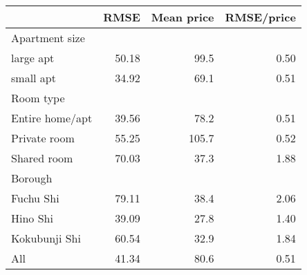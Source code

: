
\begin{tabular}{lrrr}
\toprule
 & RMSE & Mean price & RMSE/price\\
\midrule
Apartment size &  &  & \\
large apt & 50.18 & 99.5 & 0.50\\
small apt & 34.92 & 69.1 & 0.51\\
Room type &  &  & \\
Entire home/apt & 39.56 & 78.2 & 0.51\\
Private room & 55.25 & 105.7 & 0.52\\
Shared room & 70.03 & 37.3 & 1.88\\
Borough &  &  & \\
Fuchu Shi & 79.11 & 38.4 & 2.06\\
Hino Shi & 39.09 & 27.8 & 1.40\\
Kokubunji Shi & 60.54 & 32.9 & 1.84\\
All & 41.34 & 80.6 & 0.51\\
\bottomrule
\end{tabular}